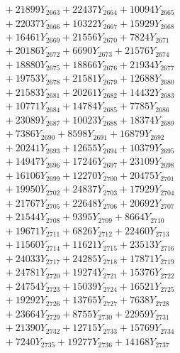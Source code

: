 \documentclass[a4paper,10pt]{article}
\begin{document}
{\begin{align}
&\;  + 21899 Y_{2663} + 22437 Y_{2664} + 10094 Y_{2665} \\[0.3ex]
&\;  + 22037 Y_{2666} + 10322 Y_{2667} + 15929 Y_{2668} \\[0.5ex]\allowbreak
&\;  + 16461 Y_{2669} + 21556 Y_{2670} + 7824 Y_{2671} \\[0.3ex]
&\;  + 20186 Y_{2672} + 6690 Y_{2673} + 21576 Y_{2674} \\[0.3ex]
&\;  + 18880 Y_{2675} + 18866 Y_{2676} + 21934 Y_{2677} \\[0.3ex]
&\;  + 19753 Y_{2678} + 21581 Y_{2679} + 12688 Y_{2680} \\[0.3ex]
&\;  + 21583 Y_{2681} + 20261 Y_{2682} + 14432 Y_{2683} \\[0.3ex]
&\;  + 10771 Y_{2684} + 14784 Y_{2685} + 7785 Y_{2686} \\[0.3ex]
&\;  + 23089 Y_{2687} + 10023 Y_{2688} + 18374 Y_{2689} \\[0.3ex]
&\;  + 7386 Y_{2690} + 8598 Y_{2691} + 16879 Y_{2692} \\[0.3ex]
&\;  + 20241 Y_{2693} + 12655 Y_{2694} + 10379 Y_{2695} \\[0.3ex]
&\;  + 14947 Y_{2696} + 17246 Y_{2697} + 23109 Y_{2698} \\[0.5ex]\allowbreak
&\;  + 16106 Y_{2699} + 12270 Y_{2700} + 20475 Y_{2701} \\[0.3ex]
&\;  + 19950 Y_{2702} + 24837 Y_{2703} + 17929 Y_{2704} \\[0.3ex]
&\;  + 21767 Y_{2705} + 22648 Y_{2706} + 20692 Y_{2707} \\[0.3ex]
&\;  + 21544 Y_{2708} + 9395 Y_{2709} + 8664 Y_{2710} \\[0.3ex]
&\;  + 19671 Y_{2711} + 6826 Y_{2712} + 22460 Y_{2713} \\[0.3ex]
&\;  + 11560 Y_{2714} + 11621 Y_{2715} + 23513 Y_{2716} \\[0.3ex]
&\;  + 24033 Y_{2717} + 24285 Y_{2718} + 17871 Y_{2719} \\[0.3ex]
&\;  + 24781 Y_{2720} + 19274 Y_{2721} + 15376 Y_{2722} \\[0.3ex]
&\;  + 24754 Y_{2723} + 15039 Y_{2724} + 16521 Y_{2725} \\[0.3ex]
&\;  + 19292 Y_{2726} + 13765 Y_{2727} + 7638 Y_{2728} \\[0.5ex]\allowbreak
&\;  + 23664 Y_{2729} + 8755 Y_{2730} + 22959 Y_{2731} \\[0.3ex]
&\;  + 21390 Y_{2732} + 12715 Y_{2733} + 15769 Y_{2734} \\[0.3ex]
&\;  + 7240 Y_{2735} + 19277 Y_{2736} + 14168 Y_{2737} \\[0.3ex]

\end{align}}
\end{document}
